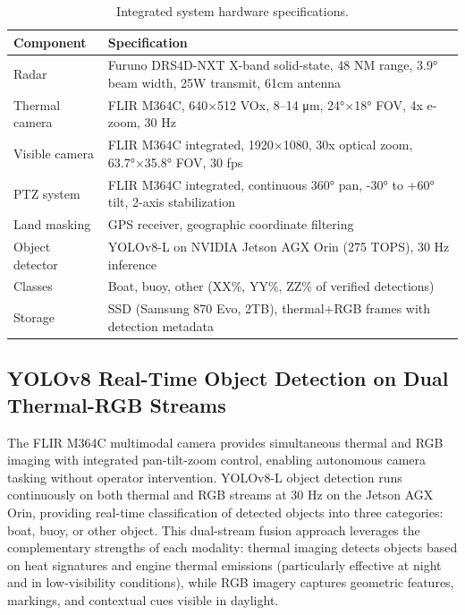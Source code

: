 \documentclass[conf]{asmeconf}
\begin{document}
\begin{table}[t]
\caption{Integrated system hardware specifications.}
\label{tab:hardware_detail}
\centering
\small
\begin{tabular}{@{}lp{5cm}@{}}
\toprule
Component & Specification \\
\midrule
Radar & Furuno DRS4D-NXT X-band solid-state, 48 NM range, 3.9° beam width, 25W transmit, 61cm antenna \\
\midrule
Thermal camera & FLIR M364C, 640×512 VOx, 8--14 μm, 24°×18° FOV, 4x e-zoom, 30 Hz \\
\midrule
Visible camera & FLIR M364C integrated, 1920×1080, 30x optical zoom, 63.7°×35.8° FOV, 30 fps \\
\midrule
PTZ system & FLIR M364C integrated, continuous 360° pan, -30° to +60° tilt, 2-axis stabilization \\
\midrule
Land masking & GPS receiver, geographic coordinate filtering \\
\midrule
Object detector & YOLOv8-L on NVIDIA Jetson AGX Orin (275 TOPS), 30 Hz inference \\
\midrule
Classes & Boat, buoy, other (XX\%, YY\%, ZZ\% of verified detections) \\
\midrule
Storage & SSD (Samsung 870 Evo, 2TB), thermal+RGB frames with detection metadata \\
\bottomrule
\end{tabular}
\end{table}

\subsection{YOLOv8 Real-Time Object Detection on Dual Thermal-RGB Streams}

The FLIR M364C multimodal camera provides simultaneous thermal and RGB imaging with integrated pan-tilt-zoom control, enabling autonomous camera tasking without operator intervention. YOLOv8-L object detection runs continuously on both thermal and RGB streams at 30 Hz on the Jetson AGX Orin, providing real-time classification of detected objects into three categories: boat, buoy, or other object. This dual-stream fusion approach leverages the complementary strengths of each modality: thermal imaging detects objects based on heat signatures and engine thermal emissions (particularly effective at night and in low-visibility conditions), while RGB imagery captures geometric features, markings, and contextual cues visible in daylight.
\end{document}
